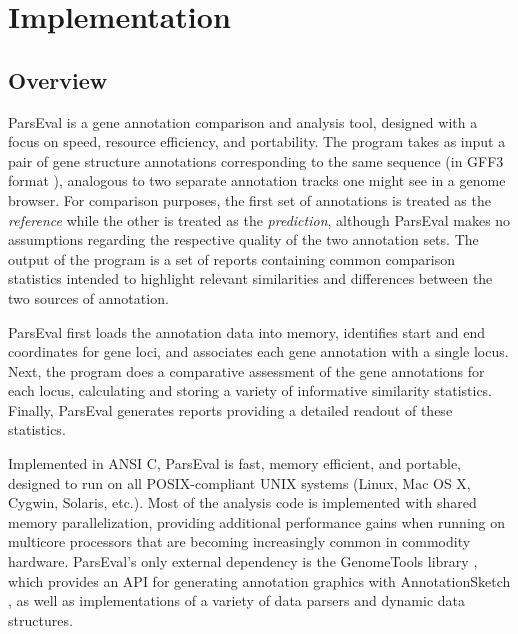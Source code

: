\section{Implementation}

\subsection{Overview}
ParsEval is a gene annotation comparison and analysis tool, designed with a focus on speed, resource efficiency, and portability.
The program takes as input a pair of gene structure annotations corresponding to the same sequence (in GFF3 format \citep{SO}), analogous to two separate annotation tracks one might see in a genome browser.
For comparison purposes, the first set of annotations is treated as the \emph{reference} while the other is treated as the \emph{prediction}, although ParsEval makes no assumptions regarding the respective quality of the two annotation sets.
The output of the program is a set of reports containing common comparison statistics intended to highlight relevant similarities and differences between the two sources of annotation.

ParsEval first loads the annotation data into memory, identifies start and end coordinates for gene loci, and associates each gene annotation with a single locus.
Next, the program does a comparative assessment of the gene annotations for each locus, calculating and storing a variety of informative similarity statistics.
Finally, ParsEval generates reports providing a detailed readout of these statistics.

Implemented in ANSI C, ParsEval is fast, memory efficient, and portable, designed to run on all POSIX-compliant UNIX systems (Linux, Mac OS X, Cygwin, Solaris, etc.).
Most of the analysis code is implemented with shared memory parallelization, providing additional performance gains when running on multicore processors that are becoming increasingly common in commodity hardware.
ParsEval's only external dependency is the GenomeTools library \citep{genometools}, which provides an API for generating annotation graphics with AnnotationSketch \citep{Steinbiss}, as well as implementations of a variety of data parsers and dynamic data structures.

